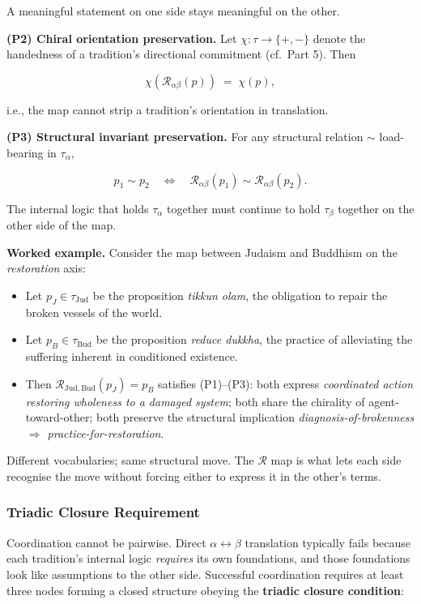 \documentclass[
]{article}
\providecommand{\tightlist}{%
  \setlength{\itemsep}{0pt}\setlength{\parskip}{0pt}}
\begin{document}
A meaningful statement on one side stays meaningful on the other.

\textbf{(P2) Chiral orientation preservation.} Let
\(\chi : \tau \to \{+, -\}\) denote the handedness of a tradition's
directional commitment (cf.~Part 5). Then

\[
\chi\!\left(\mathcal{R}_{\alpha\beta}(p)\right) \;=\; \chi(p),
\]

i.e., the map cannot strip a tradition's orientation in translation.

\textbf{(P3) Structural invariant preservation.} For any structural
relation \(\sim\) load-bearing in \(\tau_\alpha\),

\[
p_1 \sim p_2 \quad \Longleftrightarrow \quad \mathcal{R}_{\alpha\beta}(p_1) \sim \mathcal{R}_{\alpha\beta}(p_2).
\]

The internal logic that holds \(\tau_\alpha\) together must continue to
hold \(\tau_\beta\) together on the other side of the map.

\textbf{Worked example.} Consider the map between Judaism and Buddhism
on the \emph{restoration} axis:

\begin{itemize}
\tightlist
\item
  Let \(p_J \in \tau_{\mathrm{Jud}}\) be the proposition \emph{tikkun
  olam}, the obligation to repair the broken vessels of the world.
\item
  Let \(p_B \in \tau_{\mathrm{Bud}}\) be the proposition \emph{reduce
  dukkha}, the practice of alleviating the suffering inherent in
  conditioned existence.
\item
  Then \(\mathcal{R}_{\mathrm{Jud},\mathrm{Bud}}(p_J) = p_B\) satisfies
  (P1)--(P3): both express \emph{coordinated action restoring wholeness
  to a damaged system}; both share the chirality of agent-toward-other;
  both preserve the structural implication \emph{diagnosis-of-brokenness
  \(\Rightarrow\) practice-for-restoration}.
\end{itemize}

Different vocabularies; same structural move. The \(\mathcal{R}\) map is
what lets each side recognise the move without forcing either to express
it in the other's terms.

\subsubsection{Triadic Closure
Requirement}\label{triadic-closure-requirement}

Coordination cannot be pairwise. Direct \(\alpha \leftrightarrow \beta\)
translation typically fails because each tradition's internal logic
\emph{requires} its own foundations, and those foundations look like
assumptions to the other side. Successful coordination requires at least
three nodes forming a closed structure obeying the \textbf{triadic
closure condition}:
\end{document}
